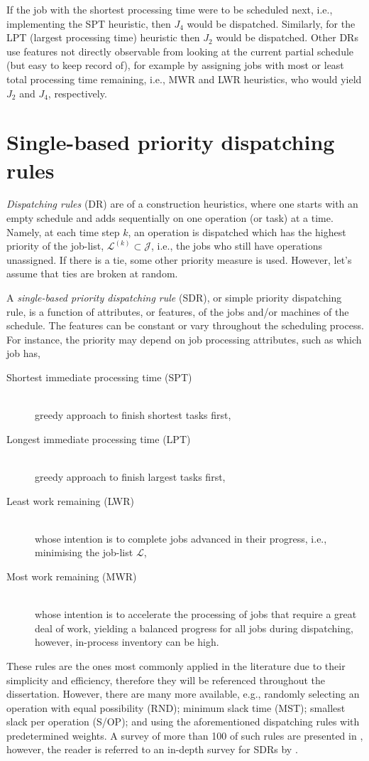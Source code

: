 \clearpage
If the job with the shortest processing time were to be scheduled next, i.e., 
implementing the SPT heuristic, then $J_4$ would be dispatched. Similarly, for 
the LPT (largest processing time) heuristic then $J_2$ would be dispatched. 
Other DRs use features not directly observable from looking at the current 
partial schedule (but easy to keep record of), for example by assigning jobs 
with most or least total processing time remaining, i.e., MWR and LWR 
heuristics, who would yield $J_2$ and $J_4$, respectively.

\section{Single-based priority dispatching rules}\label{sec:SDR}
\emph{Dispatching rules} (DR) are of a construction heuristics, where one 
starts with an empty schedule and adds sequentially on one operation (or task) 
at a time. Namely, at each time step $k$, an operation is dispatched which has 
the highest priority of the job-list, 
\mbox{$\mathcal{L}^{(k)}\subset\mathcal{J}$}, i.e., the jobs who still have 
operations unassigned. If there is a tie, some other priority measure is used. 
However, let's assume that ties are broken at random. 

A \emph{single-based priority dispatching rule} (SDR), or simple priority 
dispatching rule, is a function of attributes, or features, of the jobs and/or 
machines of the schedule. The features can be constant or vary throughout the 
scheduling process. For instance, the priority may depend on job processing 
attributes, such as which job has, 
\begin{description}
	\item[Shortest immediate processing time (SPT)] \hfill \\
	greedy approach to finish shortest tasks first,  
	\item[Longest immediate processing time (LPT)] \hfill \\
	greedy approach to finish largest tasks first, 
	\item[Least work remaining (LWR)] \hfill \\
	whose intention is to complete jobs advanced in their pro\-gress, i.e., 
	minimising the job-list $\mathcal{L}$,
	\item[Most work remaining (MWR)] \hfill \\
	whose intention is to accelerate the processing of jobs that require a 
	great deal of work, yielding a balanced progress for all jobs during 
	dispatching, however, in-process inventory can be high.
\end{description}
These rules are the ones most commonly applied in the literature due to their simplicity and efficiency, %
therefore they will be referenced throughout the dissertation. 
However, there are many more available, e.g., randomly selecting an operation 
with equal possibility (RND); minimum slack time (MST); smallest slack per 
operation (S/OP); and using the aforementioned dispatching rules with 
predetermined weights. A survey of more than 100 of such rules are presented in 
\citet{Panwalkar77}, however, the reader is referred to an in-depth survey for 
SDRs by \citet{Haupt89}. 

